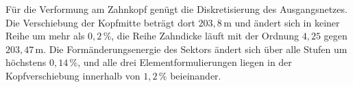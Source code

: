 
Für die Verformung am Zahnkopf genügt die Diskretisierung des Ausgangsnetzes. Die Verschiebung der Kopfmitte beträgt dort $203{,}8$\,\textmu m und ändert sich in keiner Reihe um mehr als $0{,}2$\,\%, die Reihe Zahndicke läuft mit der Ordnung $4{,}25$ gegen $203{,}47$\,\textmu m. Die Formänderungsenergie des Sektors ändert sich über alle Stufen um höchstens $0{,}14$\,\%, und alle drei Elementformulierungen liegen in der Kopfverschiebung innerhalb von $1{,}2$\,\% beieinander.


